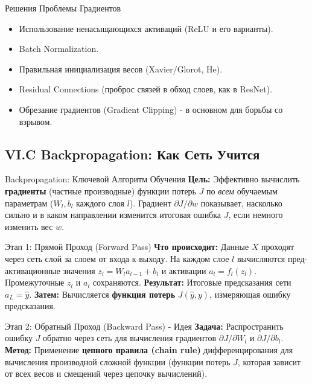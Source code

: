 \begin{myexampleblock}{Решения Проблемы Градиентов}
    \begin{itemize}[nosep, leftmargin=*]
        \item Использование ненасыщающихся активаций (ReLU и его варианты).
        \item Batch Normalization.
        \item Правильная инициализация весов (Xavier/Glorot, He).
        \item Residual Connections (проброс связей в обход слоев, как в ResNet).
        \item Обрезание градиентов (Gradient Clipping) - в основном для борьбы со взрывом.
    \end{itemize}
\end{myexampleblock}

\subsection{VI.C Backpropagation: Как Сеть Учится}

\begin{alerttextbox}{Backpropagation: Ключевой Алгоритм Обучения}
    \textbf{Цель:} Эффективно вычислить \textbf{градиенты} (частные производные) функции потерь $J$ по \textit{всем} обучаемым параметрам ($W_l, b_l$ каждого слоя $l$). Градиент $\partial J / \partial w$ показывает, насколько сильно и в каком направлении изменится итоговая ошибка $J$, если немного изменить вес $w$.
\end{alerttextbox}

\begin{myblock}{Этап 1: Прямой Проход (Forward Pass)}
    \textbf{Что происходит:} Данные $X$ проходят через сеть слой за слоем от входа к выходу. На каждом слое $l$ вычисляются пред-активационные значения $z_l = W_l a_{l-1} + b_l$ и активации $a_l = f_l(z_l)$. Промежуточные $z_l$ и $a_l$ сохраняются.
    \textbf{Результат:} Итоговые предсказания сети $a_L = \hat{y}$.
    \textbf{Затем:} Вычисляется \textbf{функция потерь} $J(\hat{y}, y)$, измеряющая ошибку предсказания.
\end{myblock}

\begin{myblock}{Этап 2: Обратный Проход (Backward Pass) - Идея}
    \textbf{Задача:} Распространить ошибку $J$ обратно через сеть для вычисления градиентов $\partial J / \partial W_l$ и $\partial J / \partial b_l$.
    \textbf{Метод:} Применение \textbf{цепного правила (chain rule)} дифференцирования для вычисления производной сложной функции (функции потерь $J$, которая зависит от всех весов и смещений через цепочку вычислений).
\end{myblock}

